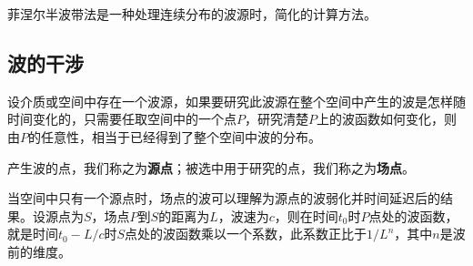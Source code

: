 



菲涅尔半波带法是一种处理连续分布的波源时，简化的计算方法。



\subsection{波的干涉}


设介质或空间中存在一个波源，如果要研究此波源在整个空间中产生的波是怎样随时间变化的，只需要任取空间中的一个点$P$，研究清楚$P$上的波函数如何变化，则由$P$的任意性，相当于已经得到了整个空间中波的分布。

产生波的点，我们称之为\textbf{源点}；被选中用于研究的点，我们称之为\textbf{场点}。

当空间中只有一个源点时，场点的波可以理解为源点的波弱化并时间延迟后的结果。设源点为$S$，场点$P$到$S$的距离为$L$，波速为$c$，则在时间$t_0$时$P$点处的波函数，就是时间$t_0-L/c$时$S$点处的波函数乘以一个系数，此系数正比于$1/L^{n}$，其中$n$是波前的维度。
























